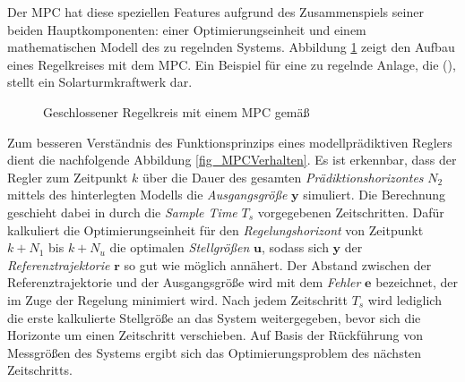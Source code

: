 Der MPC hat diese speziellen Features aufgrund des Zusammenspiels seiner beiden Hauptkomponenten: einer Optimierungseinheit und einem mathematischen Modell des zu regelnden Systems.
Abbildung \ref{fig_RegelkreisMPC} zeigt den Aufbau eines Regelkreises mit dem MPC.
Ein Beispiel für eine zu regelnde Anlage, die (), stellt ein Solarturmkraftwerk dar.

\begin{figure}[h!]
    \centering
    \setlength{\fboxsep}{1pt}
    \setlength{\fboxrule}{1pt}
\caption[Geschlossener Regelkreis mit einem MPC]{Geschlossener Regelkreis mit einem MPC gemäß\cite[S.2]{Schwenzer}}
    \label{fig_RegelkreisMPC}
\end{figure}

Zum besseren Verständnis des Funktionsprinzips eines modellprädiktiven Reglers dient die nachfolgende Abbildung \ref{fig_MPCVerhalten}.
Es ist erkennbar, dass der Regler zum Zeitpunkt $k$ über die Dauer des gesamten \textit{Prädiktionshorizontes} $N_2$ mittels des hinterlegten Modells die \textit{Ausgangsgröße} $\boldsymbol{y}$ simuliert.
Die Berechnung geschieht dabei in durch die \textit{Sample Time} $T_s$ vorgegebenen Zeitschritten.
Dafür kalkuliert die Optimierungseinheit für den \textit{Regelungshorizont} von Zeitpunkt $k+N_1$ bis $k+N_u$ die optimalen \textit{Stellgrößen} $\boldsymbol{u}$, sodass sich $\boldsymbol{y}$ der \textit{Referenztrajektorie} $\boldsymbol{r}$ so gut wie möglich annähert.
Der Abstand zwischen der Referenztrajektorie und der Ausgangsgröße wird mit dem \textit{Fehler} $\boldsymbol{e}$ bezeichnet, der im Zuge der Regelung minimiert wird.
Nach jedem Zeitschritt $T_s$ wird lediglich die erste kalkulierte Stellgröße an das System weitergegeben, bevor sich die Horizonte um einen Zeitschritt verschieben.
Auf Basis der Rückführung von Messgrößen des Systems ergibt sich das Optimierungsproblem des nächsten \mbox{Zeitschritts. \cite[S.3]{Schwenzer}}

